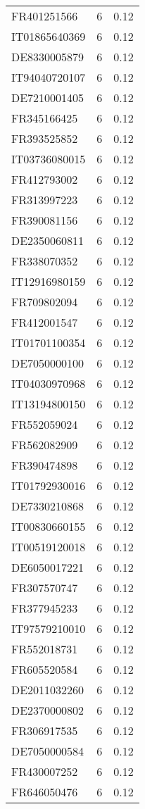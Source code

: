 \begin{table*}[htbp]
\begin{tabular}{lrr}
FR401251566 & 6 & 0.12 \\
IT01865640369 & 6 & 0.12 \\
DE8330005879 & 6 & 0.12 \\
IT94040720107 & 6 & 0.12 \\
DE7210001405 & 6 & 0.12 \\
FR345166425 & 6 & 0.12 \\
FR393525852 & 6 & 0.12 \\
IT03736080015 & 6 & 0.12 \\
FR412793002 & 6 & 0.12 \\
FR313997223 & 6 & 0.12 \\
FR390081156 & 6 & 0.12 \\
DE2350060811 & 6 & 0.12 \\
FR338070352 & 6 & 0.12 \\
IT12916980159 & 6 & 0.12 \\
FR709802094 & 6 & 0.12 \\
FR412001547 & 6 & 0.12 \\
IT01701100354 & 6 & 0.12 \\
DE7050000100 & 6 & 0.12 \\
IT04030970968 & 6 & 0.12 \\
IT13194800150 & 6 & 0.12 \\
FR552059024 & 6 & 0.12 \\
FR562082909 & 6 & 0.12 \\
FR390474898 & 6 & 0.12 \\
IT01792930016 & 6 & 0.12 \\
DE7330210868 & 6 & 0.12 \\
IT00830660155 & 6 & 0.12 \\
IT00519120018 & 6 & 0.12 \\
DE6050017221 & 6 & 0.12 \\
FR307570747 & 6 & 0.12 \\
FR377945233 & 6 & 0.12 \\
IT97579210010 & 6 & 0.12 \\
FR552018731 & 6 & 0.12 \\
FR605520584 & 6 & 0.12 \\
DE2011032260 & 6 & 0.12 \\
DE2370000802 & 6 & 0.12 \\
FR306917535 & 6 & 0.12 \\
DE7050000584 & 6 & 0.12 \\
FR430007252 & 6 & 0.12 \\
FR646050476 & 6 & 0.12 \\

\end{tabular}
\end{table*}

